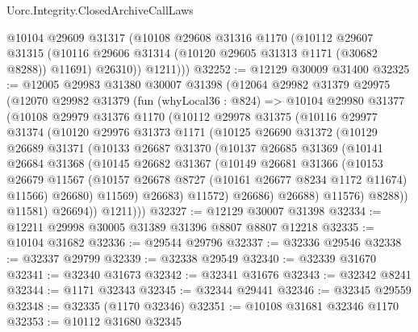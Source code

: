 \begin{lexlean}{Uorc.Integrity.ClosedArchiveCallLaws}
\begin{coremodule}
        @10104
          @29609
          @31317
          (@10108
            @29608
            @31316
            @1170
            (@10112
              @29607
              @31315
              (@10116 @29606 @31314 (@10120 @29605 @31313 @1171 (@30682 @8288)) @11691)
              @26310))
          @1211)))
@32252 := @12129 @30009 @31400
@32325 := @12005
    @29983
    @31380
    @30007
    @31398
    (@12064
      @29982
      @31379
      @29975
      (@12070
        @29982
        @31379
        (fun (whyLocal36 : @824) =>
        @10104
          @29980
          @31377
          (@10108
            @29979
            @31376
            @1170
            (@10112
              @29978
              @31375
              (@10116
                @29977
                @31374
                (@10120
                  @29976
                  @31373
                  @1171
                  (@10125
                    @26690
                    @31372
                    (@10129
                      @26689
                      @31371
                      (@10133
                        @26687
                        @31370
                        (@10137
                          @26685
                          @31369
                          (@10141
                            @26684
                            @31368
                            (@10145
                              @26682
                              @31367
                              (@10149
                                @26681
                                @31366
                                (@10153
                                  @26679
                                  @11567
                                  (@10157 @26678 @8727 (@10161 @26677 @8234 @1172 @11674) @11566)
                                  @26680)
                                @11569)
                              @26683)
                            @11572)
                          @26686)
                        @26688)
                      @11576)
                    @8288))
                @11581)
              @26694))
          @1211)))
@32327 := @12129 @30007 @31398
@32334 := @12211 @29998 @30005 @31389 @31396 @8807 @8807 @12218
@32335 := @10104 @31682
@32336 := @29544 @29796
@32337 := @32336 @29546
@32338 := @32337 @29799
@32339 := @32338 @29549
@32340 := @32339 @31670
@32341 := @32340 @31673
@32342 := @32341 @31676
@32343 := @32342 @8241
@32344 := @1171 @32343
@32345 := @32344 @29441
@32346 := @32345 @29559
@32348 := @32335 (@1170 @32346)
@32351 := @10108 @31681 @32346 @1170
@32353 := @10112 @31680 @32345

\end{coremodule}
\end{lexlean}
